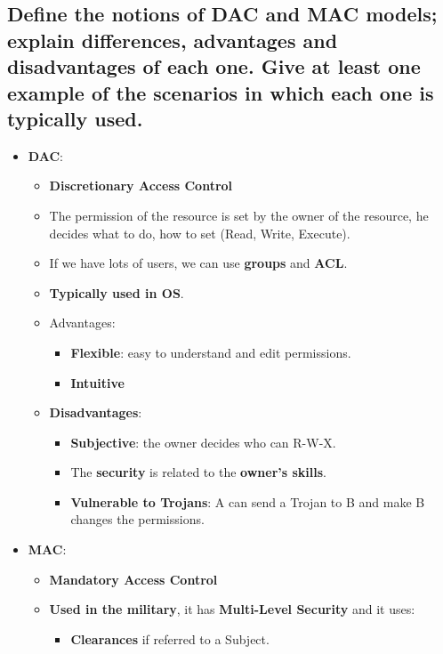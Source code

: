 \documentclass[9pt, letterpaper]{article}
\begin{document}
\subsection{Define the notions of DAC and MAC models; explain differences, advantages and disadvantages of each one. Give at least one example of the scenarios in which each one is typically used.}
\begin{itemize}
	\item \textbf{DAC}:
	      \begin{itemize}
		      \item \textbf{Discretionary Access Control}
		      \item The permission of the resource is set by the owner of the resource, he decides what to do, how to set (Read, Write, Execute).
		      \item If we have lots of users, we can use \textbf{groups} and \textbf{ACL}.
		      \item \textbf{Typically used in OS}.
		      \item Advantages:
		            \begin{itemize}
			            \item \textbf{Flexible}: easy to understand and edit permissions.
			            \item \textbf{Intuitive}
		            \end{itemize}
		      \item \textbf{Disadvantages}:
		            \begin{itemize}
			            \item \textbf{Subjective}: the owner decides who can R-W-X.
			            \item The \textbf{security} is related to the \textbf{owner's skills}.
			            \item \textbf{Vulnerable to Trojans}: A can send a Trojan to B and make B changes the permissions.
		            \end{itemize}
	      \end{itemize}
	\item \textbf{MAC}:
	      \begin{itemize}
		      \item \textbf{Mandatory Access Control}
		      \item \textbf{Used in the military}, it has \textbf{Multi-Level Security} and it uses:
		            \begin{itemize}
			            \item \textbf{Clearances} if referred to a Subject.

\end{itemize}
\end{itemize}
\end{itemize}
\end{document}
